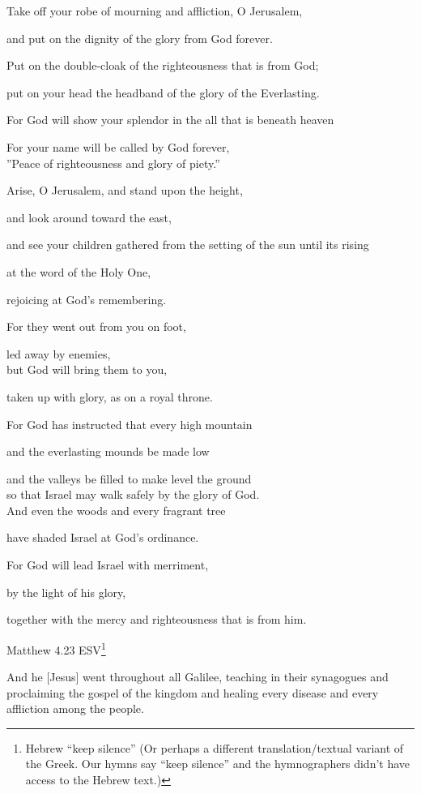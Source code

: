 \documentclass[
]{article}
\newcommand{\RL}[1]{\beginR #1\endR}
\begin{document}
Take off your robe of mourning and affliction, O Jerusalem,

and put on the dignity of the glory from God forever.

Put on the double-cloak of the righteousness that is from God;

put on your head the headband of the glory of the Everlasting.

For God will show your splendor in the all that is beneath heaven

For your name will be called by God forever,\\
\RL{''}Peace of righteousness and glory of piety.''

Arise, O Jerusalem, and stand upon the height,

and look around toward the east,

and see your children gathered from the setting of the sun until its
rising

at the word of the Holy One,

rejoicing at God\RL{'}s remembering.

For they went out from you on foot,

led away by enemies,\\
but God will bring them to you,

taken up with glory, as on a royal throne.

For God has instructed that every high mountain

and the everlasting mounds be made low

and the valleys be filled to make level the ground\\
so that Israel may walk safely by the glory of God.\\
And even the woods and every fragrant tree

have shaded Israel at God\RL{'}s ordinance.

For God will lead Israel with merriment,

by the light of his glory,

together with the mercy and righteousness that is from him.

Matthew 4.23 ESV\footnote{Hebrew ``keep silence'' (Or perhaps a
  different translation/textual variant of the Greek. Our hymns say
  ``keep silence'' and the hymnographers didn't have access to the
  Hebrew text.)}

And he {[}Jesus{]} went throughout all Galilee, teaching in their
synagogues and proclaiming the gospel of the kingdom and healing every
disease and every affliction among the people.
\end{document}
